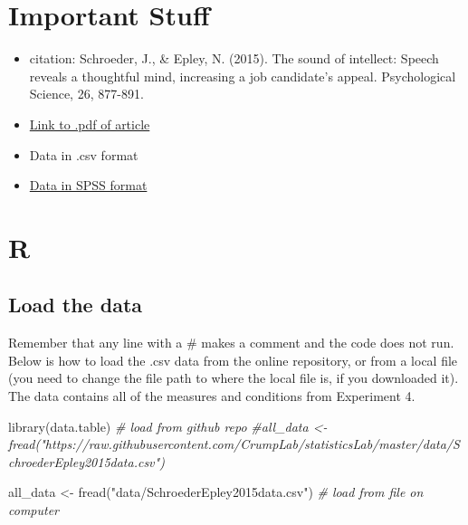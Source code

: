 \documentclass[
]{book}
\newenvironment{Shaded}{\begin{snugshade}}{\end{snugshade}}
\newcommand{\CommentTok}[1]{\textcolor[rgb]{0.56,0.35,0.01}{\textit{#1}}}
\newcommand{\FunctionTok}[1]{\textcolor[rgb]{0.00,0.00,0.00}{#1}}
\newcommand{\NormalTok}[1]{#1}
\newcommand{\OtherTok}[1]{\textcolor[rgb]{0.56,0.35,0.01}{#1}}
\newcommand{\StringTok}[1]{\textcolor[rgb]{0.31,0.60,0.02}{#1}}
\providecommand{\tightlist}{%
  \setlength{\itemsep}{0pt}\setlength{\parskip}{0pt}}
\begin{document}
\hypertarget{important-stuff-1}{%
\section{Important Stuff}\label{important-stuff-1}}

\begin{itemize}
\tightlist
\item
  citation: Schroeder, J., \& Epley, N. (2015). The sound of intellect: Speech reveals a thoughtful mind, increasing a job candidate's appeal. Psychological Science, 26, 877-891.
\item
  \href{http://journals.sagepub.com/stoken/default+domain/PhtK6MPtXvkgnYRrnGbA/full}{Link to .pdf of article}
\item
  Data in .csv format
\item
  \href{https://drive.google.com/open?id=0Bz-rhZ21ShvOVXlDMjEzQU1oY1k}{Data in SPSS format}
\end{itemize}

\hypertarget{r-7}{%
\section{R}\label{r-7}}

\hypertarget{load-the-data-1}{%
\subsection{Load the data}\label{load-the-data-1}}

Remember that any line with a \# makes a comment and the code does not run. Below is how to load the .csv data from the online repository, or from a local file (you need to change the file path to where the local file is, if you downloaded it). The data contains all of the measures and conditions from Experiment 4.

\begin{Shaded}
\begin{Highlighting}[]
\FunctionTok{library}\NormalTok{(data.table)}
\CommentTok{\# load from github repo}
\CommentTok{\#all\_data \textless{}{-} fread("https://raw.githubusercontent.com/CrumpLab/statisticsLab/master/data/SchroederEpley2015data.csv")}

\NormalTok{all\_data }\OtherTok{\textless{}{-}} \FunctionTok{fread}\NormalTok{(}\StringTok{"data/SchroederEpley2015data.csv"}\NormalTok{) }\CommentTok{\# load from file on computer}
\end{Highlighting}
\end{Shaded}
\end{document}
